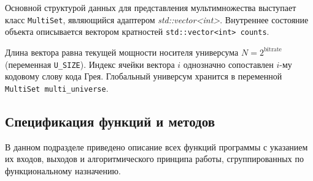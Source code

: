 \documentclass[14pt, a4paper]{extarticle}
\begin{document}
	Основной структурой данных для представления мультимножества выступает класс \texttt{MultiSet}, являющийся адаптером \textit{std::vector<int>}. Внутреннее состояние объекта описывается вектором кратностей	\texttt{std::vector<int> counts}.
	
	Длина вектора равна текущей мощности носителя универсума $N = 2^{\text{bitrate}}$ (переменная \texttt{U\_SIZE}). Индекс ячейки вектора $i$ однозначно сопоставлен $i$-му кодовому слову кода Грея. Глобальный универсум хранится в переменной \texttt{MultiSet multi\_universe}.
	
	\subsection{Спецификация функций и методов}
	
	В данном подразделе приведено описание всех функций программы с указанием их входов, выходов и алгоритмического принципа работы, сгруппированных по функциональному назначению.
	
\end{document}
